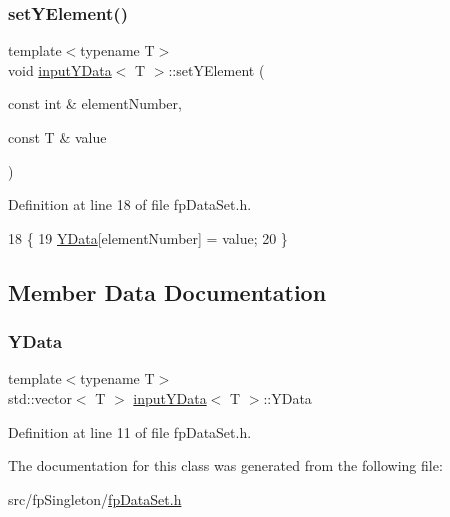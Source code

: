 \subsubsection{\texorpdfstring{set\+Y\+Element()}{setYElement()}}
{\footnotesize\ttfamily template$<$typename T$>$ \\
void \hyperlink{classinputYData}{input\+Y\+Data}$<$ T $>$\+::set\+Y\+Element (\begin{DoxyParamCaption}\item[{const int \&}]{element\+Number,  }\item[{const T \&}]{value }\end{DoxyParamCaption})\hspace{0.3cm}{\ttfamily [inline]}}



Definition at line 18 of file fp\+Data\+Set.\+h.


\begin{DoxyCode}
18                                                                          \{
19             \hyperlink{classinputYData_a0b1d0b2e92ec4351f8a098a365fd9746}{YData}[elementNumber] = value;
20         \}
\end{DoxyCode}


\subsection{Member Data Documentation}
\mbox{\label{classinputYData_a0b1d0b2e92ec4351f8a098a365fd9746}} 
\subsubsection{\texorpdfstring{Y\+Data}{YData}}
{\footnotesize\ttfamily template$<$typename T$>$ \\
std\+::vector$<$ T $>$ \hyperlink{classinputYData}{input\+Y\+Data}$<$ T $>$\+::Y\+Data\hspace{0.3cm}{\ttfamily [protected]}}



Definition at line 11 of file fp\+Data\+Set.\+h.



The documentation for this class was generated from the following file\+:\begin{DoxyCompactItemize}
\item 
src/fp\+Singleton/\hyperlink{fpDataSet_8h}{fp\+Data\+Set.\+h}\end{DoxyCompactItemize}

